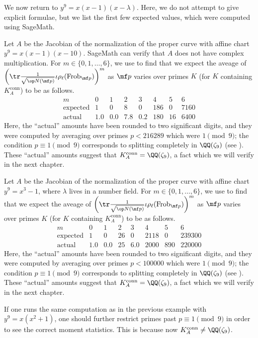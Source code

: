 \documentclass[../thesis.tex]{subfiles}
\begin{document}
We now return to $y^9=x(x-1)(x-\lambda)$. Here, we do not attempt to give explicit formulae, but we list the first few expected values, which were computed using SageMath.
\begin{example}
	Let $A$ be the Jacobian of the normalization of the proper curve with affine chart $y^9=x(x-1)(x-10)$. SageMath can verify that $A$ does not have complex multiplication. For $m\in\{0,1,\ldots,6\}$, we use  to find that we expect the aveage of $\left(\tr\frac1{\sqrt{\op N(\mf p)}}\iota\rho_\ell(\mathrm{Frob}_{\mf p})\right)^m$ as $\mf p$ varies over primes $K$ (for $K$ containing $K_A^{\mathrm{conn}}$) to be as follows.
	\[\begin{array}{c|cccccccc}
		m & 0 & 1 & 2 & 3 & 4 & 5 & 6 \\\hline
		\text{expected} & 1 & 0 & 8 & 0 & 186 & 0 & 7160 \\
		\text{actual} & 1.0 & 0.0 & 7.8 & 0.2 & 180 & 16 & 6400
	\end{array}\]
	Here, the ``actual'' amounts have been rounded to two significant digits, and they were computed by averaging over primes $p<216289$ which were $1\pmod9$; the condition $p\equiv1\pmod9$ corresponds to splitting completely in $\QQ(\zeta_9)$ (see ). These ``actual'' amounts suggest that $K_A^{\mathrm{conn}}=\QQ(\zeta_9)$, a fact which we will verify in the next chapter.
\end{example}
\begin{example}
	Let $A$ be the Jacobian of the normalization of the proper curve with affine chart $y^9=x^3-1$, where $\lambda$ lives in a number field. For $m\in\{0,1,\ldots,6\}$, we use  to find that we expect the aveage of $\left(\tr\frac1{\sqrt{\op N(\mf p)}}\iota\rho_\ell(\mathrm{Frob}_{\mf p})\right)^m$ as $\mf p$ varies over primes $K$ (for $K$ containing $K_A^{\mathrm{conn}}$) to be as follows.
	\[\begin{array}{c|cccccccc}
		m & 0 & 1 & 2 & 3 & 4 & 5 & 6 \\\hline
		\text{expected} & 1 & 0 & 26 & 0 & 2118 & 0 & 239300 \\
		\text{actual} & 1.0 & 0.0 & 25 & 6.0 & 2000 & 890 & 220000
	\end{array}\]
	Here, the ``actual'' amounts have been rounded to two significant digits, and they were computed by averaging over primes $p<100000$ which were $1\pmod9$; the condition $p\equiv1\pmod9$ corresponds to splitting completely in $\QQ(\zeta_9)$ (see ). These ``actual'' amounts suggest that $K_A^{\mathrm{conn}}=\QQ(\zeta_9)$, a fact which we will verify in the next chapter.
\end{example}
\begin{remark}
	If one runs the same computation as in the previous example with $y^9=x\left(x^2+1\right)$, one should further restrict primes past $p\equiv1\pmod9$ in order to see the correct moment statistics. This is because now $K_A^{\mathrm{conn}}\ne\QQ(\zeta_9)$.
\end{remark}
\end{document}
